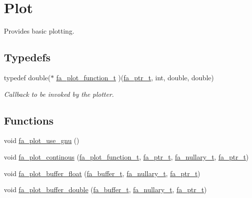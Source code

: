 \hypertarget{group___fa_plot}{\section{Plot}
\label{group___fa_plot}
}


Provides basic plotting.  


\subsection*{Typedefs}
\begin{DoxyCompactItemize}
\item 
typedef double($\ast$ \hyperlink{group___fa_plot_ga6c91e512a0be9ba8332e0023697c8c8f}{fa\-\_\-plot\-\_\-function\-\_\-t} )(\hyperlink{group___fa_ga915ddeae99ad7568b273d2b876425197}{fa\-\_\-ptr\-\_\-t}, int, double, double)
\begin{DoxyCompactList}\small\item\em Callback to be invoked by the plotter. \end{DoxyCompactList}\end{DoxyCompactItemize}
\subsection*{Functions}
\begin{DoxyCompactItemize}
\item 
void \hyperlink{group___fa_plot_ga016706d500d136cf55d2b01002163de7}{fa\-\_\-plot\-\_\-use\-\_\-gnu} ()
\item 
void \hyperlink{group___fa_plot_ga285506e3a3a8cdba5ecad4f3a70a6833}{fa\-\_\-plot\-\_\-continous} (\hyperlink{group___fa_plot_ga6c91e512a0be9ba8332e0023697c8c8f}{fa\-\_\-plot\-\_\-function\-\_\-t}, \hyperlink{group___fa_ga915ddeae99ad7568b273d2b876425197}{fa\-\_\-ptr\-\_\-t}, \hyperlink{group___fa_ga43b940a9294fd58a54087ef0b416e479}{fa\-\_\-nullary\-\_\-t}, \hyperlink{group___fa_ga915ddeae99ad7568b273d2b876425197}{fa\-\_\-ptr\-\_\-t})
\item 
void \hyperlink{group___fa_plot_ga07bfe0fbe9280762eca9d2f3204ba2ee}{fa\-\_\-plot\-\_\-buffer\-\_\-float} (\hyperlink{group___fa_buffer_ga0ed7a1d783ab322e2e8be02432d0839e}{fa\-\_\-buffer\-\_\-t}, \hyperlink{group___fa_ga43b940a9294fd58a54087ef0b416e479}{fa\-\_\-nullary\-\_\-t}, \hyperlink{group___fa_ga915ddeae99ad7568b273d2b876425197}{fa\-\_\-ptr\-\_\-t})
\item 
void \hyperlink{group___fa_plot_ga245d4644c4b5a90497ab27b46c3ceaf2}{fa\-\_\-plot\-\_\-buffer\-\_\-double} (\hyperlink{group___fa_buffer_ga0ed7a1d783ab322e2e8be02432d0839e}{fa\-\_\-buffer\-\_\-t}, \hyperlink{group___fa_ga43b940a9294fd58a54087ef0b416e479}{fa\-\_\-nullary\-\_\-t}, \hyperlink{group___fa_ga915ddeae99ad7568b273d2b876425197}{fa\-\_\-ptr\-\_\-t})
\end{DoxyCompactItemize}


